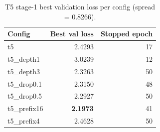 \begin{table}[ht]
\centering
\caption{T5 stage-1 best validation loss per config (spread = 0.8266).}
\label{tab:s1_valloss_t5}
\footnotesize
\begin{tabular}{lrr}
\toprule
Config & Best val loss & Stopped epoch \\
\midrule
t5 & 2.4293 & 17 \\
t5\_depth1 & 3.0239 & 12 \\
t5\_depth3 & 2.3263 & 50 \\
t5\_drop0.1 & 2.3150 & 48 \\
t5\_drop0.5 & 2.2927 & 50 \\
t5\_prefix16 & \textbf{2.1973} & 41 \\
t5\_prefix4 & 2.4628 & 50 \\
\bottomrule
\end{tabular}
\end{table}
